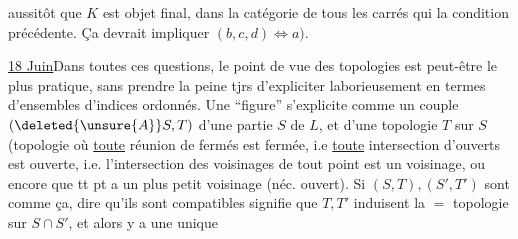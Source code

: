 aussitôt que $K$ est objet final, dans la catégorie de tous les carrés 
  qui  la condition précédente. Ça devrait impliquer $(b,c,d)\Longleftrightarrow a)$.

\uline{18 Juin}\quad Dans toutes ces questions, le point de vue des  topologies  est peut-être le plus pratique, sans prendre la peine tjrs d'expliciter laborieusement en termes d'ensembles d'indices ordonnés. Une ``figure''  s'explicite comme un couple $(\deleted{\unsure{A}}S,T)$ d'une partie $S$ de $L$, et d'une topologie $T$ sur $S$ (topologie où \uline{toute} réunion de fermés est fermée, i.e \uline{toute} intersection d'ouverts est ouverte, i.e. l'intersection des voisinages  de tout point est un voisinage, ou encore que tt pt a un plus petit voisinage (néc. ouvert). Si $(S,T),(S',T')$ sont comme ça, dire qu'ils sont compatibles signifie que $T,T'$ induisent la $=$ topologie sur $S\cap S'$,  et alors y a une unique
